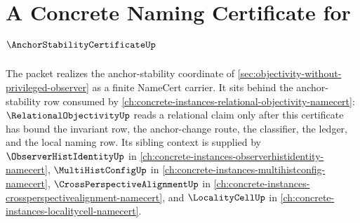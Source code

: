 \chapter{A Concrete Naming Certificate for $\AnchorStabilityCertificateUp$}
\label{ch:concrete-instances-anchor-stability-certificate-namecert}

The \AnchorStabilityCertificateUp{} packet realizes the anchor-stability coordinate of \autoref{sec:objectivity-without-privileged-observer} as a finite NameCert carrier. It sits behind the anchor-stability row consumed by \autoref{ch:concrete-instances-relational-objectivity-namecert}: $\RelationalObjectivityUp$ reads a relational claim only after this certificate has bound the invariant row, the anchor-change route, the classifier, the ledger, and the local naming row. Its sibling context is supplied by $\ObserverHistIdentityUp$ in \autoref{ch:concrete-instances-observerhistidentity-namecert}, $\MultiHistConfigUp$ in \autoref{ch:concrete-instances-multihistconfig-namecert}, $\CrossPerspectiveAlignmentUp$ in \autoref{ch:concrete-instances-crossperspectivealignment-namecert}, and $\LocalityCellUp$ in \autoref{ch:concrete-instances-localitycell-namecert}.


